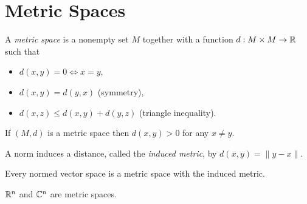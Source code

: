 \chapter{Metric Spaces}
\begin{defn}
  A \emph{metric space} is a nonempty set $M$ together with a function
  $d:M\times M\to\mathbb{R}$ such that
  \begin{itemize}
    \item $d(x,y)=0\iff x=y$,
    \item $d(x,y)=d(y,x)$ (symmetry), 
    \item $d(x,z)\le d(x,y)+d(y,z)$ (triangle inequality).
  \end{itemize}
\end{defn}
\begin{prop}
  If $(M,d)$ is a metric space then $d(x,y)>0$ for any $x\ne y$.
\end{prop}
\begin{defn}
  A norm induces a distance, called the \emph{induced metric}, by
  $d(x,y)=\|y-x\|$.
\end{defn}
\begin{prop}
  Every normed vector space is a metric space with the induced metric.
\end{prop}
\begin{cor}
  $\mathbb{R}^n$ and $\mathbb{C}^n$ are metric spaces.
\end{cor}

